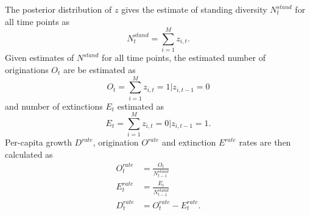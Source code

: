 \documentclass[12pt,letterpaper]{article}
\begin{document}
The posterior distribution of \(z\) gives the estimate of standing diversity \(N^{stand}_{t}\) for all time points as 
\begin{equation}
  N^{stand}_{t} = \sum_{i = 1}^{M} z_{i, t}.
  \label{eq:stand_est}
\end{equation}
Given estimates of \(N^{stand}\) for all time points, the estimated number of originations \(O_{t}\) are be estimated as 
\begin{equation}
  O_t = \sum_{i = 1}^{M} z_{i, t} = 1 | z_{i, t - 1} = 0
  \label{eq:orig_est}
\end{equation}
and number of extinctions \(E_{t}\) estimated as
\begin{equation}
  E_{t} = \sum_{i = 1}^{M} z_{i, t} = 0 | z_{i, t - 1} = 1.
  \label{eq:death_est}
\end{equation}
Per-capita growth \(D^{rate}\), origination \(O^{rate}\) and extinction \(E^{rate}\) rates are then calculated as
\begin{equation}
  \begin{aligned}
    O^{rate}_{t} &= \frac{O_t}{N^{stand}_{t - 1}} \\
    E^{rate}_{t} &= \frac{E_t}{N^{stand}_{t - 1}} \\
    D^{rate}_{t} &= O^{rate}_{t} - E^{rate}_{t}. \\
  \end{aligned}
  \label{eq:per_capita_est}
\end{equation}

\end{document}
